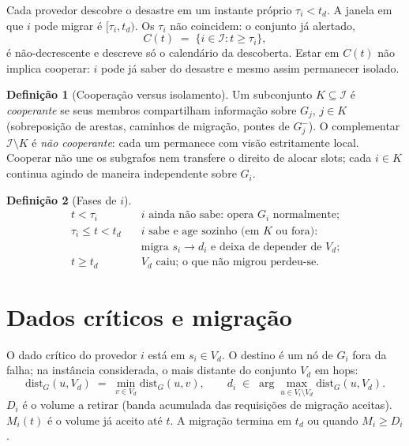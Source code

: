 \documentclass[11pt,a4paper]{article}
\theoremstyle{definition}
\newtheorem{definicao}{Definição}
\begin{document}
Cada provedor descobre o desastre em um instante próprio $\tau_i<t_d$.
A janela em que $i$ pode migrar é $[\tau_i,t_d)$.
Os $\tau_i$ não coincidem: o conjunto já alertado,
\begin{equation}
  C(t) \;=\; \{i\in\mathcal{I}: t\ge\tau_i\},
\end{equation}
é não-decrescente e descreve só o calendário da descoberta.
Estar em $C(t)$ não implica cooperar: $i$ pode já saber do desastre e mesmo assim permanecer isolado.

\begin{definicao}[Cooperação versus isolamento]
Um subconjunto $K\subseteq\mathcal{I}$ é \emph{cooperante} se seus membros compartilham informação sobre $G_j$, $j\in K$ (sobreposição de arestas, caminhos de migração, pontes de $G_j^{-}$).
O complementar $\mathcal{I}\setminus K$ é \emph{não cooperante}: cada um permanece com visão estritamente local.
Cooperar não une os subgrafos nem transfere o direito de alocar slots; cada $i\in K$ continua agindo de maneira independente sobre $G_i$.
\end{definicao}

\begin{definicao}[Fases de $i$]
\begin{align}
  t<\tau_i
  &\quad\text{$i$ ainda não sabe: opera $G_i$ normalmente;}
  \\
  \tau_i\le t<t_d
  &\quad\text{$i$ sabe e age sozinho (em $K$ ou fora):}
  \nonumber\\
  &\quad\text{migra $s_i\to d_i$ e deixa de depender de $V_d$;}
  \\
  t\ge t_d
  &\quad\text{$V_d$ caiu; o que não migrou perdeu-se.}
\end{align}
\end{definicao}

\section{Dados críticos e migração}

O dado crítico do provedor $i$ está em $s_i\in V_d$.
O destino é um nó de $G_i$ fora da falha; na instância considerada, o mais distante do conjunto $V_d$ em hops:
\begin{equation}
  \mathrm{dist}_G(u,V_d)
  \;=\;
  \min_{v\in V_d}\mathrm{dist}_G(u,v),
  \qquad
  d_i \;\in\; \arg\max_{u\in V_i\setminus V_d} \mathrm{dist}_G(u,V_d).
\end{equation}
$D_i$ é o volume a retirar (banda acumulada das requisições de migração aceitas).
$M_i(t)$ é o volume já aceito até $t$.
A migração termina em $t_d$ ou quando $M_i\ge D_i$.
\end{document}
